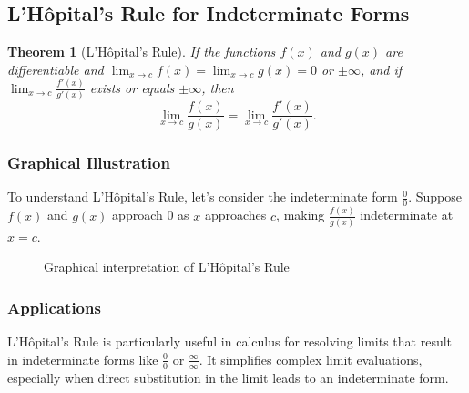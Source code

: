 \documentclass[a4paper,12pt]{book}
\newtheorem{theorem}{Theorem}
\begin{document}
\subsection{L'Hôpital's Rule for Indeterminate Forms}
\label{subsec:lhospitals_rule}

\begin{theorem}[L'Hôpital's Rule]
If the functions \( f(x) \) and \( g(x) \) are differentiable and \( \lim_{x \to c} f(x) = \lim_{x \to c} g(x) = 0 \) or \( \pm \infty \), and if \( \lim_{x \to c} \frac{f'(x)}{g'(x)} \) exists or equals \( \pm \infty \), then
\[ \lim_{x \to c} \frac{f(x)}{g(x)} = \lim_{x \to c} \frac{f'(x)}{g'(x)}. \]
\end{theorem}

\subsubsection*{Graphical Illustration}
To understand L'Hôpital's Rule, let's consider the indeterminate form \(\frac{0}{0}\). Suppose \( f(x) \) and \( g(x) \) approach 0 as \( x \) approaches \( c \), making \( \frac{f(x)}{g(x)} \) indeterminate at \( x = c \). 

\begin{figure}[H]
\centering
{}
\caption{Graphical interpretation of L'Hôpital's Rule}
\end{figure}

\subsubsection*{Applications}
L'Hôpital's Rule is particularly useful in calculus for resolving limits that result in indeterminate forms like \( \frac{0}{0} \) or \( \frac{\infty}{\infty} \). It simplifies complex limit evaluations, especially when direct substitution in the limit leads to an indeterminate form.
\end{document}
